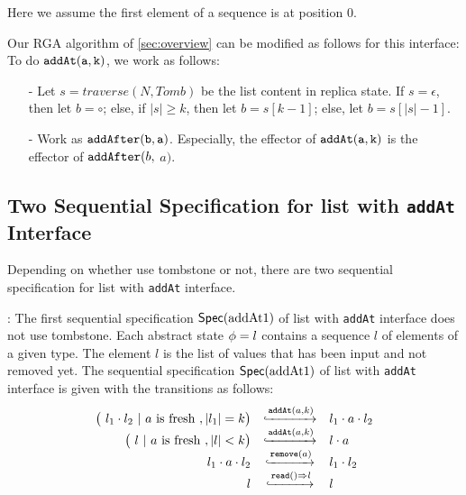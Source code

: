 Here we assume the first element of a sequence is at position $0$.

Our RGA algorithm of \sectionautorefname \ref{sec:overview} can be modified as follows for this interface: To do $\alabelshort[{\tt addAt}]{a,k}$, we work as follows:

\begin{itemize}
\setlength{\itemsep}{0.5pt}
\item[-] Let $s = traverse(N, Tomb)$ be the list content in replica state. If $s = \epsilon$, then let $b = \circ$; else, if $\vert s \vert \geq k$, then let $b=s[k-1]$; else, let $b=s[\vert s \vert -1]$.

\item[-] Work as $\alabelshort[{\tt addAfter}]{b,a}$. Especially, the effector of $\alabelshort[{\tt addAt}]{a,k}$ is the effector of ${\tt addAfter}(b,$ $a)$.
\end{itemize}



\subsection{Two Sequential Specification for list with {\tt addAt} Interface}
\label{subsec:two sequential specification for list with addAt interface}

Depending on whether use tombstone or not, there are two sequential specification for list with {\tt addAt} interface.

: The first sequential specification $\specAddatOne$ of list with {\tt addAt} interface does not use tombstone. Each abstract state $\abstate = l$ contains a sequence $l$ of elements of a given type. The element $l$ is the list of values that has been input and not removed yet. The sequential specification $\specAddatOne$ of list with {\tt addAt} interface is given with the transitions as follows:
\[
  \begin{array}{rcl}
    \big(\ l_1 \cdot l_2 \ |\ a\text{ is fresh}\ , \vert l_1 \vert = k \big)
     & \specarrow{\alabelshort[\mathtt{addAt}]{a,k}}
     & l_1 \cdot a \cdot l_2 \\
      \big(\ l \ |\ a\text{ is fresh}\ , \vert l \vert < k \big)
     & \specarrow{\alabelshort[\mathtt{addAt}]{a,k}}
     & l \cdot a \\
     l_1 \cdot a \cdot l_2
     & \specarrow{\alabelshort[\mathtt{remove}]{a}}
     & l_1 \cdot l_2 \\
     l
     & \specarrow{\alabellong[\mathtt{read}]{}{l}{}}
     & l
   \end{array}
\]

